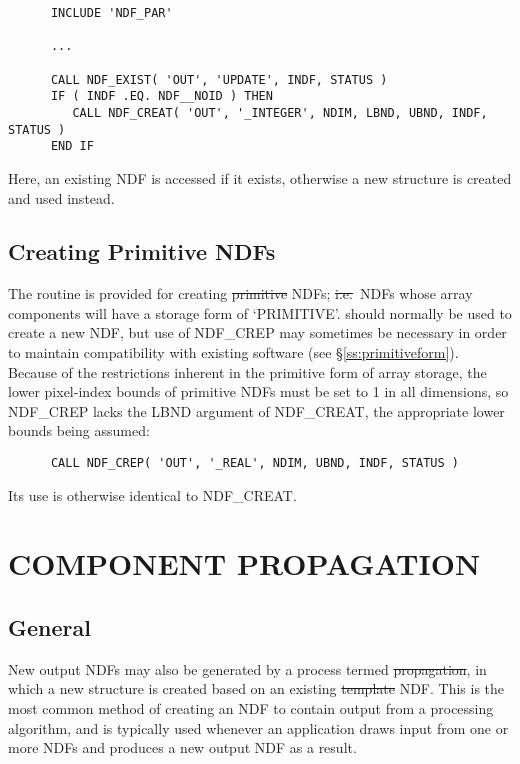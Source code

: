 \small
\begin{verbatim}
      INCLUDE 'NDF_PAR'

      ...

      CALL NDF_EXIST( 'OUT', 'UPDATE', INDF, STATUS )
      IF ( INDF .EQ. NDF__NOID ) THEN
         CALL NDF_CREAT( 'OUT', '_INTEGER', NDIM, LBND, UBND, INDF, STATUS )
      END IF
\end{verbatim}
\normalsize

Here, an existing NDF is accessed if it exists, otherwise a new structure
is created and used instead. 

\subsection{\label{ss:crep}Creating Primitive NDFs}

The routine  is provided for creating
\st{primitive\/} NDFs; \st{i.e.}\ NDFs whose array components will
have a storage form of `PRIMITIVE'. 
 should normally be used to create a new NDF, but use of NDF\_CREP
may sometimes be necessary in order to maintain compatibility with existing
software (see \S\ref{ss:primitiveform}). 
Because of the restrictions inherent in the primitive form of array storage,
the lower pixel-index bounds of primitive NDFs must be set to 1 in all
dimensions, so NDF\_CREP lacks the LBND argument of NDF\_CREAT, the
appropriate lower bounds being assumed: 

\small
\begin{verbatim}
      CALL NDF_CREP( 'OUT', '_REAL', NDIM, UBND, INDF, STATUS )
\end{verbatim}
\normalsize

Its use is otherwise identical to NDF\_CREAT.


\section{\label{ss:propagate}COMPONENT PROPAGATION}

\subsection{General}

New output NDFs may also be generated by a process termed \st{propagation},
in which a new structure is created based on an existing \st{template\/} NDF.
This is the most common method of creating an NDF to contain output from a
processing algorithm, and is typically used whenever an application draws
input from one or more NDFs and produces a new output NDF as a result. 

